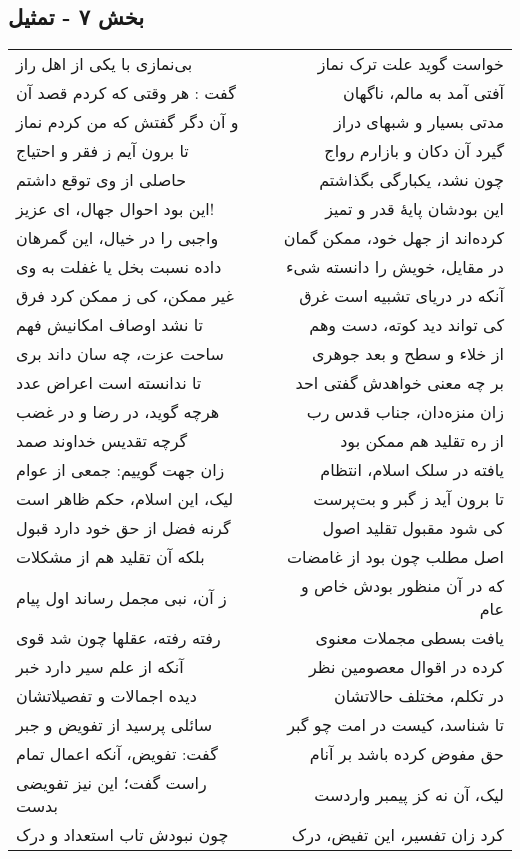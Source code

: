 \begin{center}
\section*{بخش ۷ - تمثیل}
\label{sec:007}
\begin{longtable}{l p{0.5cm} r}
بی‌نمازی با یکی از اهل راز
&&
خواست گوید علت ترک نماز
\\
گفت : هر وقتی که کردم قصد آن
&&
آفتی آمد به مالم، ناگهان
\\
و آن دگر گفتش که من کردم نماز
&&
مدتی بسیار و شبهای دراز
\\
تا برون آیم ز فقر و احتیاج
&&
گیرد آن دکان و بازارم رواج
\\
حاصلی از وی توقع داشتم
&&
چون نشد، یکبارگی بگذاشتم
\\
این بود احوال جهال، ای عزیز!
&&
این بودشان پایهٔ قدر و تمیز
\\
واجبی را در خیال، این گمرهان
&&
کرده‌اند از جهل خود، ممکن گمان
\\
داده نسبت بخل یا غفلت به وی
&&
در مقایل، خویش را دانسته شیء
\\
غیر ممکن، کی ز ممکن کرد فرق
&&
آنکه در دریای تشبیه است غرق
\\
تا نشد اوصاف امکانیش فهم
&&
کی تواند دید کوته، دست وهم
\\
ساحت عزت، چه سان داند بری
&&
از خلاء و سطح و بعد جوهری
\\
تا ندانسته است اعراض عدد
&&
بر چه معنی خواهدش گفتی احد
\\
هرچه گوید، در رضا و در غضب
&&
زان منزه‌دان، جناب قدس رب
\\
گرچه تقدیس خداوند صمد
&&
از ره تقلید هم ممکن بود
\\
زان جهت گوییم: جمعی از عوام
&&
یافته در سلک اسلام، انتظام
\\
لیک، این اسلام، حکم ظاهر است
&&
تا برون آید ز گبر و بت‌پرست
\\
گرنه فضل از حق خود دارد قبول
&&
کی شود مقبول تقلید اصول
\\
بلکه آن تقلید هم از مشکلات
&&
اصل مطلب چون بود از غامضات
\\
ز آن، نبی مجمل رساند اول پیام
&&
که در آن منظور بودش خاص و عام
\\
رفته رفته، عقلها چون شد قوی
&&
یافت بسطی مجملات معنوی
\\
آنکه از علم سیر دارد خبر
&&
کرده در اقوال معصومین نظر
\\
دیده اجمالات و تفصیلاتشان
&&
در تکلم، مختلف حالاتشان
\\
سائلی پرسید از تفویض و جبر
&&
تا شناسد، کیست در امت چو گبر
\\
گفت: تفویض، آنکه اعمال تمام
&&
حق مفوض کرده باشد بر آنام
\\
راست گفت؛ این نیز تفویضی بدست
&&
لیک، آن نه کز پیمبر واردست
\\
چون نبودش تاب استعداد و درک
&&
کرد زان تفسیر، این تفیض، درک
\\
\end{longtable}
\end{center}
